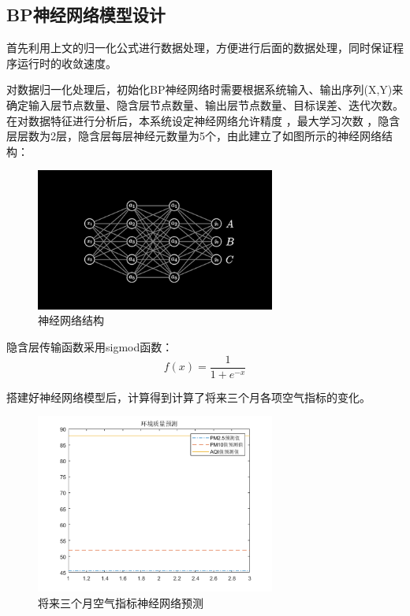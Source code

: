 \documentclass[UTF8]{ctexart}
\begin{document}
\subsection{BP神经网络模型设计}
首先利用上文的归一化公式进行数据处理，方便进行后面的数据处理，同时保证程序运行时的收敛速度。

对数据归一化处理后，初始化BP神经网络时需要根据系统输入、输出序列(X,Y)来确定输入层节点数量、隐含层节点数量、输出层节点数量、目标误差、迭代次数。在对数据特征进行分析后，本系统设定神经网络允许精度 ，最大学习次数 ，隐含层层数为2层，隐含层每层神经元数量为5个，由此建立了如图所示的神经网络结构：
\begin{figure}[H] %
    \centering %
    \includegraphics[width=0.7\textwidth]{./picture/network.png} %
    \caption{神经网络结构} 
\end{figure}


隐含层传输函数采用sigmod函数：
\begin{equation}
    f(x)=\frac{1}{1+e^{-x}}
\end{equation}

搭建好神经网络模型后，计算得到计算了将来三个月各项空气指标的变化。
\begin{figure}[H] %
    \centering %
    \includegraphics[width=0.7\textwidth]{./picture/sjwl2.png} %
    \caption{将来三个月空气指标神经网络预测} 
\end{figure}
\end{document}
